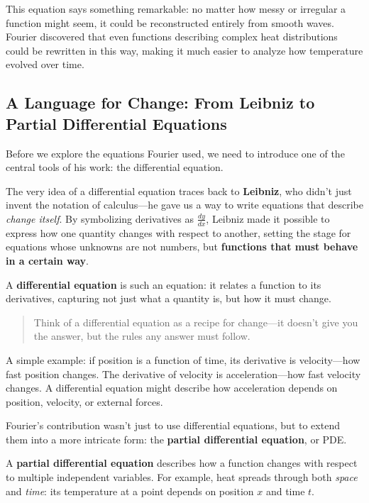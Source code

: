 This equation says something remarkable: no matter how messy or irregular a function might seem, it could be reconstructed entirely from smooth waves. Fourier discovered that even functions describing complex heat distributions could be rewritten in this way, making it much easier to analyze how temperature evolved over time.


\subsection{A Language for Change: From Leibniz to Partial Differential Equations}

Before we explore the equations Fourier used, we need to introduce one of the central tools of his work: the differential equation.

The very idea of a differential equation traces back to \textbf{Leibniz}, who didn’t just invent the notation of calculus—he gave us a way to write equations that describe \emph{change itself}.  
By symbolizing derivatives as \( \frac{dy}{dx} \), Leibniz made it possible to express how one quantity changes with respect to another, setting the stage for equations whose unknowns are not numbers, but \textbf{functions that must behave in a certain way}.

A \textbf{differential equation} is such an equation: it relates a function to its derivatives, capturing not just what a quantity is, but how it must change.

\begin{quote}
Think of a differential equation as a recipe for change—it doesn’t give you the answer, but the rules any answer must follow.
\end{quote}

A simple example: if position is a function of time, its derivative is velocity—how fast position changes. The derivative of velocity is acceleration—how fast velocity changes. A differential equation might describe how acceleration depends on position, velocity, or external forces.

Fourier’s contribution wasn’t just to use differential equations, but to extend them into a more intricate form: the \textbf{partial differential equation}, or PDE.

A \textbf{partial differential equation} describes how a function changes with respect to multiple independent variables. For example, heat spreads through both \emph{space} and \emph{time}: its temperature at a point depends on position \( x \) and time \( t \).

